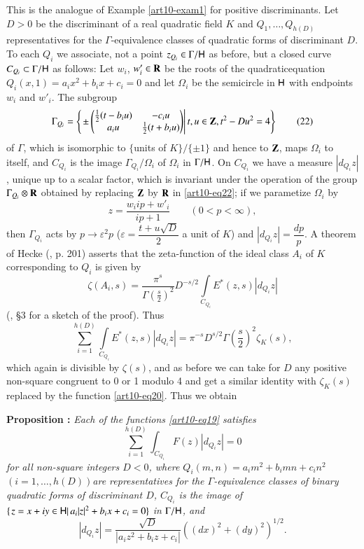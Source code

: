 This is the analogue of Example \ref{art10-exam1} for positive discriminants. Let  $D > 0$ be the discriminant of a real quadratic field $K$ and $Q_1, \ldots, Q_{h(D)}$ representatives for the $\Gamma$-equivalence classes of quadratic forms of discriminant $D$. To each $Q_i$  we associate, not a point $z_{Q_i} \in \Gamma / \mathsf{H}$ as before, but a closed curve $C_{Q_i} \subset \Gamma / \mathsf{H}$ as follows: Let $w_i$, $w'_i \in \mathbf{R}$ be the roots of the quadratic\pageoriginale equation $Q_i(x,1) = a_i x^2 + b_i x + c_i = 0$ and let $\Omega_i$ be the semicircle in $\mathsf{H}$ with endpoints $w_i$ and $w'_i$. The subgroup
\begin{equation*}
\Gamma_{Q_i} = 
\left\{
\left.  \pm 
\left(\begin{matrix} 
\frac{1}{2} (t - b_i u) & -c_i u \\
a_i u & \frac{1}{2} (t + b_i u)   
\end{matrix}\right) 
\right|
t, u \in \mathbf{Z} , t^2 - D u^2  = 4 \right\}\tag{22}
\label{art10-eq22}
\end{equation*}
of $\Gamma$, which is isomorphic to $\{$units of $K\} / \{\pm 1\}$  and hence to $\mathbf{Z}$, maps $\Omega_i$ to itself, and $C_{Q_i}$ is the image $\Gamma_{Q_i} / \Omega_i$ of $\Omega_i$ in $\Gamma / \mathsf{H}$. On $C_{Q_i}$ we have a measure $|d_{Q_i} z|$, unique up to a scalar factor, which is invariant under the operation of the group $\Gamma_{Q_i} \otimes \mathbf{R}$  obtained by replacing $\mathbf{Z}$ by $\mathbf{R}$ in \eqref{art10-eq22}; if we parametize $\Omega_i$ by
$$
z = \frac{w_i i p + w'_i }{i p+1} \qquad (0 < p < \infty), 
$$
then $\Gamma_{Q_i}$ acts by $p \to \varepsilon^2 p$ ($\varepsilon = \dfrac{t + u \sqrt{D}}{2}$ a unit of $K$)  and $|d_{Q_i} z| = \dfrac{dp}{p}$. A theorem of Hecke (\cite{art10-2}, p. 201) asserts that the zeta-function of the ideal class $A_i$ of $K$ corresponding to $Q_i$ is given by 
$$
\zeta(A_i, s) = \frac{\pi^s}{\Gamma (\frac{s}{2})^2} D^{-s/2}\int\limits_{C_{Q_i}} E^\ast (z,s) |d_{Q_i} z|
$$
(\cf \cite{art10-10},  \S 3 for a sketch of the proof). Thus
$$
\sum\limits^{h(D)}_{i=1} \int\limits_{C_{Q_i}} E^\ast (z,s) |d_{Q_i} z| = \pi^{-s} D^{s/2} \Gamma (\frac{s}{2})^2 \zeta_K (s),
$$
which again is divisible by $\zeta(s)$, and as before we can take for $D$ any positive non-square congruent to 0 or 1 modulo 4 and get a similar identity with $\zeta_K(s)$ replaced by the function \eqref{art10-eq20}. Thus we obtain

\medskip
\noindent
{\bfseries Proposition :\label{art10-prop2}}
\textit{Each of the functions \eqref{art10-eq19} satisfies}
\begin{equation}
\sum\limits^{h(D)}_{i=1} \int_{C_{Q_i}} F (z) |d_{Q_i} z| = 0 \tag{23}\label{art10-eq23} 
\end{equation}
\textit{for all non-square integers $D < 0$, where $Q_i (m,n) = a_i m^2 + b_i mn + c_i n^2$ $(i=1,\ldots, h(D))$\pageoriginale are representatives for the $\Gamma$-equivalence classes of binary quadratic forms of discriminant $D$, $C_{Q_i}$ is the image of $\{\left.z = x+ iy \in \mathsf{H} \right| a_i |z|^2 +  b_i x+ c_i =0\}$ in $\Gamma / \mathsf{H}$, and}
$$
|d_{Q_i} z| = \frac{\sqrt{D}}{|a_i z^2 + b_i z + c_i|} ((dx)^2 + (dy)^2)^{1/2}.
$$

